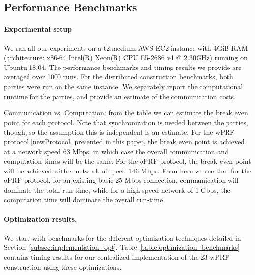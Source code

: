 \subsection{Performance Benchmarks}
\paragraph{Experimental setup}
We ran all our experiments on a t2.medium AWS EC2 instance with 4GiB RAM (architecture: x86-64 Intel(R) Xeon(R) CPU E5-2686 v4 @ 2.30GHz) running on Ubuntu 18.04. The performance benchmarks and timing results we provide are averaged over 1000 runs. For the distributed construction benchmarks, both parties were run on the same instance. We separately report the computational runtime for the parties, and provide an estimate of the communication costs. 

Communication vs. Computation: from the table we can estimate the break even point for each protocol. Note that synchronization is needed between the parties, though, so the assumption this is independent is an estimate. For the  wPRF protocol \ref{newProtocol} presented in this paper, the break even point is achieved  at a network speed 63 Mbps, in which case the overall communication and computation times will be the same. For the oPRF protocol, the break even point will be achieved with a network of speed 146 Mbps. 
From here we see that for the oPRF protocol, for an existing basic 25 Mbps connection, communication will dominate the total run-time, while for a high speed network of 1 Gbps, the computation time will dominate the overall run-time.


\paragraph{Optimization results.}
We start with benchmarks for the different optimization techniques detailed in Section~\ref{subsec:implementation_opt}. Table~\ref{table:optimization_benchmarks} contains timing results for our centralized implementation of the 23-wPRF construction using these optimizations.


